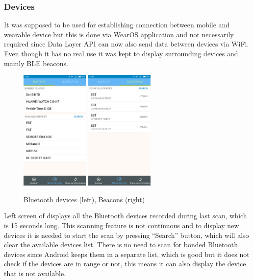 \subsubsection{Devices}\label{subsec:Devices}
It was supposed to be used for establishing connection between mobile and wearable device but this is done via WearOS application and not necessarily required since Data Layer API can now also send data between devices via WiFi. Even though it has no real use it was kept to display surrounding devices and mainly BLE beacons.

\begin{figure}[h!]
	\begin{centering}
		\includegraphics[width=0.30\textwidth]{img/devices_bl}
		\includegraphics[width=0.30\textwidth]{img/devices_ble}
		\par\end{centering}
	\caption{Bluetooth devices (left), Beacons (right)\label{fig:bl_ble_list}}
	\label{fig07c05}
\end{figure}

Left screen of  displays all the Bluetooth devices recorded during last scan, which is 15 seconds long. This scanning feature is not continuous and to display new devices it is needed to start the scan by pressing \enquote{Search} button, which will also clear the available devices list. There is no need to scan for bonded Bluetooth devices since Android keeps them in a separate list, which is good but it does not check if the devices are in range or not, this means it can also display the device that is not available.

